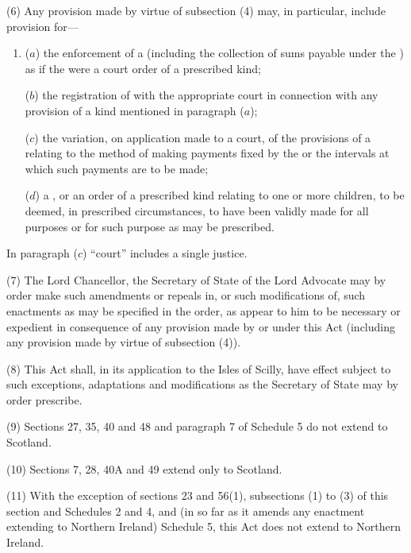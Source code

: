\documentclass[12pt,a4paper]{article}
\begin{document}
(6)
Any provision made by virtue of subsection (4) may, in particular, include provision for---
\begin{enumerate}\item[]
($a$) the enforcement of a  (including the collection of sums payable under the ) as if the  were a court order of a prescribed kind;

($b$) the registration of  with the appropriate court in connection with any provision of a kind mentioned in paragraph ($a$);

($c$) the variation, on application made to a court, of the provisions of a  relating to the method of making payments fixed by the  or the intervals at which such payments are to be made;

($d$) a , or an order of a prescribed kind relating to one or more children, to be deemed, in prescribed circumstances, to have been validly made for all purposes or for such purpose as may be prescribed.
\end{enumerate}

In paragraph ($c$) “court” includes a single justice.

(7)
The Lord Chancellor, the Secretary of State of the Lord Advocate may by order make such amendments or repeals in, or such modifications of, such enactments as may be specified in the order, as appear to him to be necessary or expedient in consequence of any provision made by or under this Act (including any provision made by virtue of subsection (4)).

(8)
This Act shall, in its application to the Isles of Scilly, have effect subject to such exceptions, adaptations and modifications as the Secretary of State may by order prescribe.

(9)
Sections 27, 35, 40 and 48 and paragraph 7 of Schedule 5 do not extend to Scotland.

(10) Sections 7, 28, 40A and 49 extend only to Scotland.

(11)
With the exception of sections 23 and 56(1), subsections (1) to (3) of this section and Schedules 2 and 4, and (in so far as it amends any enactment extending to Northern Ireland) Schedule 5, this Act does not extend to Northern Ireland.
\end{document}
